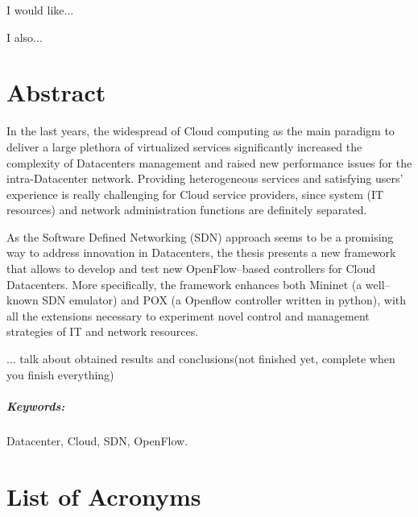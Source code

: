 \documentclass[12pt,english,oneside]{book}
\begin{document}

\noindent I would like...

\medskip{}
\noindent I also...

\chapter*{Abstract}


\begin{singlespace}
\hspace{0.6cm}
In the last years, the widespread of Cloud computing as the main paradigm to deliver a large plethora of virtualized services significantly increased the complexity of Datacenters management and raised new performance issues for the intra-Datacenter network.
Providing heterogeneous services and satisfying users' experience is really challenging for Cloud service providers, since system (IT resources) and network administration functions are definitely separated.

As the Software Defined Networking (SDN) approach seems to be a promising way to address innovation in Datacenters, the thesis presents a new framework that allows to develop and test new OpenFlow--based controllers for Cloud Datacenters.
More specifically, the framework enhances both Mininet (a well--known SDN emulator) and POX (a Openflow controller written in python), with all the extensions necessary to experiment novel control and management strategies of IT and network resources.

... talk about obtained results and conclusions(not finished yet, complete when you finish everything)

\end{singlespace}

\paragraph{Keywords:}
Datacenter, Cloud, SDN, OpenFlow.

\newpage

\tableofcontents{}

\clearpage

\chapter*{List of Acronyms}
\end{document}
